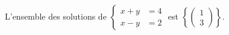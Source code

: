 L'ensemble des solutions de $\begin{cases} x+y &= 4 \\ x-y &= 2 \end{cases}$ est $\left\{\begin{pmatrix}1\\3\end{pmatrix}\right\}$.

\begin{reponses}
\end{reponses}

